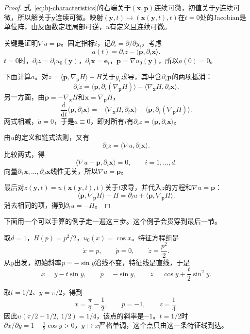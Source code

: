 \begin{proof}
式~\eqref{eq:hj-characteristics}的右端关于$(\bm{x},\bm{p})$连续可微，初值关于$\bm{y}$连续可微，所以解关于$\bm{y}$连续可微。映射$(\bm{y},t)\mapsto(\bm{x}(\bm{y},t),t)$在$t=0$处的Jacobian是单位阵，由反函数定理局部可逆，$u$有定义且连续可微。

关键是证明$\nabla u=\bm{p}$。固定指标$i$，记$\partial_i=\partial/\partial y_i$，考虑
\[
  a(t)=\partial_iz-\langle\bm{p},\partial_i\bm{x}\rangle.
\]
$t=0$时，$\partial_iz=\partial_iu_0(\bm{y})$，$\partial_i\bm{x}=\bm{e}_i$，$\bm{p}=\nabla u_0(\bm{y})$，所以$a(0)=0$。

下面计算$\dot{a}$。对$\dot{z}=\langle\bm{p},\nabla_{\bm{p}}H\rangle-H$关于$y_i$求导，其中含$\partial_i\bm{p}$的两项抵消：
\[
  \partial_i\dot{z}=\langle\bm{p},\partial_i(\nabla_{\bm{p}}H)\rangle-\langle\nabla_{\bm{x}}H,\partial_i\bm{x}\rangle.
\]
另一方面，由$\dot{\bm{p}}=-\nabla_{\bm{x}}H$和$\dot{\bm{x}}=\nabla_{\bm{p}}H$，
\[
  \frac{\mathrm{d}}{\mathrm{d}t}\langle\bm{p},\partial_i\bm{x}\rangle=-\langle\nabla_{\bm{x}}H,\partial_i\bm{x}\rangle+\langle\bm{p},\partial_i(\nabla_{\bm{p}}H)\rangle.
\]
两式相减，$\dot{a}=0$，于是$a\equiv0$，即对所有$i$有$\partial_iz=\langle\bm{p},\partial_i\bm{x}\rangle$。

由$u$的定义和链式法则，又有
\[
  \partial_iz=\langle\nabla u,\partial_i\bm{x}\rangle.
\]
比较两式，得
\[
  \langle\nabla u-\bm{p},\partial_i\bm{x}\rangle=0,\qquad i=1,\ldots,d.
\]
向量$\partial_1\bm{x},\ldots,\partial_d\bm{x}$线性无关，所以$\nabla u=\bm{p}$。

最后对$z(\bm{y},t)=u(\bm{x}(\bm{y},t),t)$关于$t$求导，并代入$\dot{z}$的方程和$\nabla u=\bm{p}$：
\[
  \langle\bm{p},\nabla_{\bm{p}}H\rangle-H=\partial_tu+\langle\bm{p},\nabla_{\bm{p}}H\rangle.
\]
消去相同的项，得到$\partial_tu=-H$。
\end{proof}

下面用一个可以手算的例子走一遍这三步。这个例子会贯穿到最后一节。

\begin{example}[余弦初值]
\label{ex:hj-cos}
取$d=1$，$H(p)=p^2/2$，$u_0(x)=\cos x$。特征方程组是
\[
  \dot{x}=p,\qquad\dot{p}=0,\qquad\dot{z}=\frac{p^2}{2}.
\]
从$y$出发，初始斜率$p=-\sin y$沿线不变，特征线是直线，于是
\[
  x=y-t\sin y,\qquad p=-\sin y,\qquad z=\cos y+\frac{t}{2}\sin^2y.
\]

取$t=1/2$、$y=\pi/2$，得到
\[
  x=\frac{\pi}{2}-\frac12,\qquad p=-1,\qquad z=\frac14.
\]
因此$u(\pi/2-1/2,\ 1/2)=1/4$，该点的斜率是$-1$。$t=1/2$时$\partial x/\partial y=1-\frac12\cos y>0$，$y\mapsto x$严格单调，这个点只由这一条特征线到达。
\end{example}

